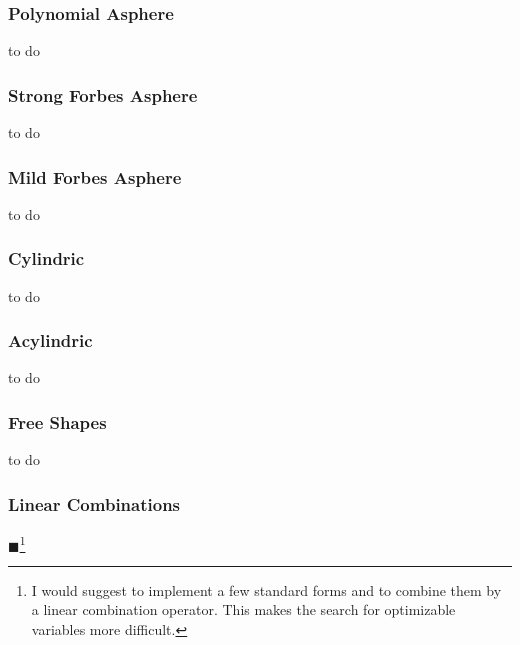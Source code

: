 \documentclass[12pt,a4paper,twoside,openright,BCOR10mm,headsepline,titlepage,abstracton,chapterprefix,final]{scrreprt}
\newcommand{\remark}[1]{{\color{red}$\blacksquare$}\footnote{{\color{red}#1}}}
\begin{document}
\subsubsection{Polynomial Asphere}
to do
\subsubsection{Strong Forbes Asphere}
to do
\subsubsection{Mild Forbes Asphere}
to do
\subsubsection{Cylindric}
to do
\subsubsection{Acylindric}
to do
\subsubsection{Free Shapes}
to do

\subsubsection{Linear Combinations}
\remark{I would suggest to implement a few standard forms and to combine them by a linear combination operator. This makes the search for optimizable
variables more difficult.}
\end{document}
